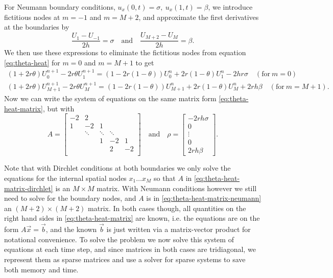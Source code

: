 For Neumann boundary conditions, $u_x(0, t) = \sigma, \: u_x(1, t) = \beta$, 
we introduce fictitious nodes at $m=-1$ and $m=M+2$, 
and approximate the first derivatives at the boundaries by
\begin{equation*}
    \frac{U_1 - U_{-1}}{2h} = \sigma
    \quad \text{and} \quad
    \frac{U_{M+2} - U_{M}}{2h} = \beta. 
\end{equation*}
We then use these expressions to eliminate the fictitious nodes from equation \eqref{eq:theta-heat} for $m=0$ and $m=M+1$ to get
\begin{equation*}
\begin{split}
    (1+2r\theta)U_0^{n+1} - 2r\theta U_1^{n+1} = \left(1-2r(1-\theta)\right)U_0^n + 2r(1-\theta)U_1^n - 2hr\sigma
    \quad (\text{for} \: m=0) \\
    (1+2r\theta)U_{M+1}^{n+1} - 2r\theta U_M^{n+1} = \left(1-2r(1-\theta)\right)U_{M+1}^n + 2r(1-\theta)U_M^n + 2rh\beta
    \quad (\text{for} \: m=M+1). 
\end{split}
\end{equation*}
Now we can write the system of equations on the same matrix form \eqref{eq:theta-heat-matrix}, 
but with 
\begin{equation}
    A = 
    \begin{bmatrix}
    -2 & 2 \\
    1 & -2 & 1 & \\
      & \ddots & \ddots & \ddots & \\
      &   & 1 & -2 & 1 \\
      &   &  & 2 & -2 \\
    \end{bmatrix}
    \quad \text{and} \quad
    \rho = 
    \begin{bmatrix}
        -2rh\sigma \\ 0 \\ \vdots \\ 0 \\ 2rh\beta
    \end{bmatrix}
    .
    \label{eq:theta-heat-matrix-neumann}
\end{equation}

Note that with Dirchlet conditions at both boundaries we only solve the equations for the internal spatial nodes $x_1 \dots x_M$ so that $A$ in \eqref{eq:theta-heat-matrix-dirchlet} is an $M \times M$ matrix. 
With Neumann conditions however we still need to solve for the boundary nodes, 
and $A$ is in \eqref{eq:theta-heat-matrix-neumann} an $(M+2) \times (M+2)$ matrix. 
In both cases though, all quantities on the right hand sides in \eqref{eq:theta-heat-matrix} are known, 
i.e. the equations are on the form $A\vec{x}=\vec{b}$, 
and the known $\vec{b}$ is just written via a matrix-vector product for notational convenience. 
To solve the problem we now solve this system of equations at each time step, 
and since matrices in both cases are tridiagonal, 
we represent them as sparse matrices and use a solver for sparse systems to save both memory and time. 

